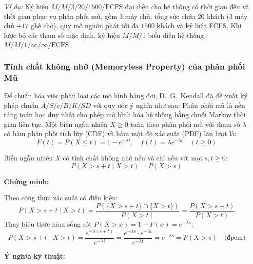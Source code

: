 \textit{Ví dụ:} Ký hiệu $M/M/3/20/1500/\text{FCFS}$ đại diện cho hệ thống có thời gian đến và thời gian phục vụ phân phối mũ, gồm $3$ máy chủ, tổng sức chứa $20$ khách ($3$ máy chủ $+ 17$ ghế chờ), quy mô nguồn phát tối đa $1500$ khách và kỷ luật FCFS. Khi lược bỏ các tham số mặc định, ký hiệu $M/M/1$ biểu diễn hệ thống $M/M/1/\infty/\infty/\text{FCFS}$.

\subsubsection{Tính chất không nhớ (Memoryless Property) của phân phối Mũ}

\hspace{0.5cm}Để chuẩn hóa việc phân loại các mô hình hàng đợi, D.~G.~Kendall đã đề xuất ký pháp chuẩn $A/S/c/B/K/SD$ với quy ước ý nghĩa như sau:
Phân phối mũ là nền tảng toán học duy nhất cho phép mô hình hóa hệ thống bằng chuỗi Markov thời gian liên tục. Một biến ngẫu nhiên $X \ge 0$ tuân theo phân phối mũ với tham số $\lambda$ có hàm phân phối tích lũy (CDF) và hàm mật độ xác suất (PDF) lần lượt là:
\begin{equation}
    F(t) = P(X \le t) = 1 - e^{-\lambda t}, \quad f(t) = \lambda e^{-\lambda t} \quad (t \ge 0)
\end{equation}

\begin{theorempop}[title=\textbf{Định lý: Tính chất không nhớ của phân phối Mũ}]
Biến ngẫu nhiên $X$ có tính chất không nhớ nếu và chỉ nếu với mọi $s, t \ge 0$:
\begin{equation}
    P(X > s + t \mid X > t) = P(X > s)
\end{equation}

\textbf{Chứng minh:} 

Theo công thức xác suất có điều kiện:
\begin{equation}
    P(X > s + t \mid X > t) = \frac{P(\{X > s + t\} \cap \{X > t\})}{P(X > t)} = \frac{P(X > s + t)}{P(X > t)}
\end{equation}
Thay biểu thức hàm sống sót $P(X > x) = 1 - F(x) = e^{-\lambda x}$:
\begin{equation}
    P(X > s + t \mid X > t) = \frac{e^{-\lambda(s+t)}}{e^{-\lambda t}} = \frac{e^{-\lambda s} \cdot e^{-\lambda t}}{e^{-\lambda t}} = e^{-\lambda s} = P(X > s) \quad \text{(đpcm)}
\end{equation}
\end{theorempop}

\textbf{Ý nghĩa kỹ thuật:} 

